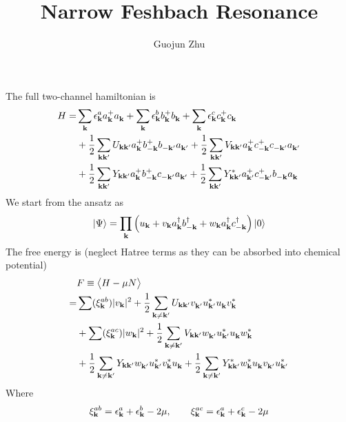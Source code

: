 \documentclass{article}
\author{Guojun Zhu}
\title{Narrow Feshbach Resonance}
\begin{document}
\maketitle

{}
\section{}
 The full two-channel hamiltonian is
\begin{equation}\label{eq:uvw:hamiltonian}
\begin{split}
 H=&\sum_\vk\epsilon^a_\vk{}a^+_\vk{}a^{}_\vk+\sum_\vk\epsilon^b_\vk{}b^+_\vk{}b^{}_\vk+\sum_\vk\epsilon^c_\vk{}c^+_\vk{}c^{}_\vk\\
  &+\nth{2}\sum_{\vk\vk'}U_{\vk\vk'}a^+_\vk{}b^+_{-\vk}{}b^{}_{-\vk'}a^{}_{\vk'}
	+\nth{2}\sum_{\vk\vk'}V_{\vk\vk'}a^+_\vk{}c^+_{-\vk}{}c^{}_{-\vk'}a^{}_{\vk'}\\
 &+\nth{2}\sum_{\vk\vk'}Y_{\vk\vk'}a^+_\vk{}b^+_{-\vk}{}c^{}_{-\vk'}a^{}_{\vk'}
	+\nth{2}\sum_{\vk\vk'}Y^*_{\vk\vk'}a^+_{\vk'}{}c^+_{-\vk'}{}b^{}_{-\vk}a^{}_{\vk}
\end{split} 
\end{equation}
 We start from the ansatz as 
\begin{equation}\label{eq:ansatz}
 \ket{\Psi}=\prod_\vk\br{u_\vk+v_\vk{}a^\dg_\vk{}b^\dg_{-\vk}+w_\vk{}a^\dg_\vk{}c^\dg_{-\vk}}\ket{0}
\end{equation}
The free energy is (neglect Hatree terms as they can be absorbed into chemical potential)
\begin{equation}\label{eq:uvw:F}
 \begin{split}
  &F\equiv\av{H-\mu{}N}\\
    =&\sum(\xi^{ab}_\vk)\abs{v_\vk}^2+\nth2\sum_{\vk\neq\vk'}U_{\vk\vk'}v^{}_{\vk'}u^*_{\vk'}u^{}_\vk{}v^*_\vk\\
    &+\sum(\xi^{ac}_\vk)\abs{w_\vk}^2
      +\nth2\sum_{\vk\neq\vk'}V_{\vk\vk'}w^{}_{\vk'}u^*_{\vk'}u^{}_\vk{}w^*_\vk\\
    &  +\nth2\sum_{\vk\neq\vk'}Y_{\vk\vk'}w^{}_{\vk'}{u^{*}_{\vk'}}v^*_\vk{}u^{}_\vk
        +\nth2\sum_{\vk\neq\vk'}Y^*_{\vk\vk'}w^*_{\vk}{u^{}_{\vk}}v^{}_{\vk'}{}u^{*}_{\vk'}
 \end{split}
\end{equation}
Where 
\begin{equation*}
 \xi^{ab}_\vk=\epsilon^a_\vk+\epsilon^b_\vk-2\mu,\qquad
  \xi^{ac}_\vk=\epsilon^a_\vk+\epsilon^c_\vk-2\mu
 \end{equation*}
\end{document}
